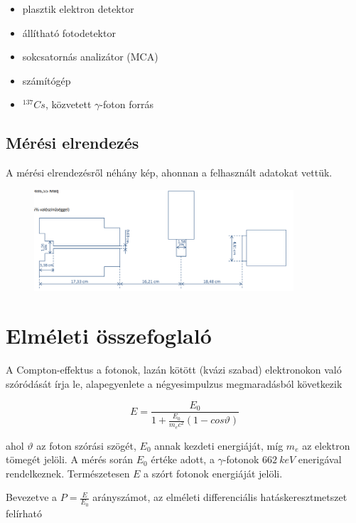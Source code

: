 \documentclass[a4paper,12pt]{article}
\begin{document}
\begin{itemize}
\item plasztik elektron detektor
\item állítható fotodetektor
\item sokcsatornás analizátor (MCA)
\item számítógép
\item $^{137}Cs$, közvetett $\gamma$-foton forrás
\end{itemize}

\subsection{Mérési elrendezés}

\par A mérési elrendezésről néhány kép, ahonnan a felhasznált adatokat vettük.

\vspace{1cm}

\begin{figure}[!htb]
\centering
\includegraphics[width=0.86\textwidth]{meresi.png}
\end{figure}

\section{Elméleti összefoglaló}

\par A Compton-effektus a fotonok, lazán kötött (kvázi szabad) elektronokon való szóródását írja le, alapegyenlete a négyesimpulzus megmaradásból következik

\begin{equation*}
	E = \frac{E_{0}}{1 + \frac{E_{0}}{m_{e}c^{2}}(1 - cos\vartheta)}	
\end{equation*}

ahol $\vartheta$ az foton szórási szögét, $E_{0}$ annak kezdeti energiáját, míg $m_{e}$ az elektron tömegét jelöli. A mérés során $E_{0}$ értéke adott, a $\gamma$-fotonok $662~keV$ enerigával rendelkeznek. Természetesen $E$ a szórt fotonok energiáját jelöli.
\par Bevezetve a $P = \frac{E}{E_{0}}$ arányszámot, az elméleti differenciális hatáskeresztmetszet felírható
\end{document}
